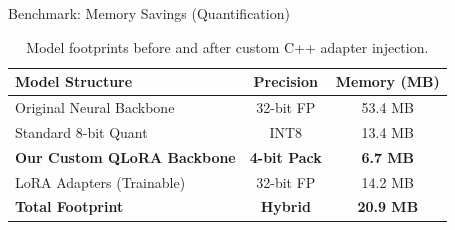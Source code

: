 \documentclass[aspectratio=169]{beamer}
\begin{document}
\begin{frame}{Benchmark: Memory Savings (Quantification)}
    \begin{table}[]
        \centering
        \begin{tabular}{@{}lcc@{}}
        \toprule
        \textbf{Model Structure} & \textbf{Precision} & \textbf{Memory (MB)} \\ \midrule
        Original Neural Backbone  & 32-bit FP         & 53.4 MB               \\
        Standard 8-bit Quant     & INT8              & 13.4 MB           \\
        \textbf{Our Custom QLoRA Backbone} & \textbf{4-bit Pack}        & \textbf{6.7 MB}      \\
        LoRA Adapters (Trainable) & 32-bit FP       & 14.2 MB               \\ \midrule
        \textbf{Total Footprint} & \textbf{Hybrid} & \textbf{20.9 MB}      \\ \bottomrule
        \end{tabular}
    \caption{Model footprints before and after custom C++ adapter injection.}
    \end{table}
\end{frame}
\end{document}
